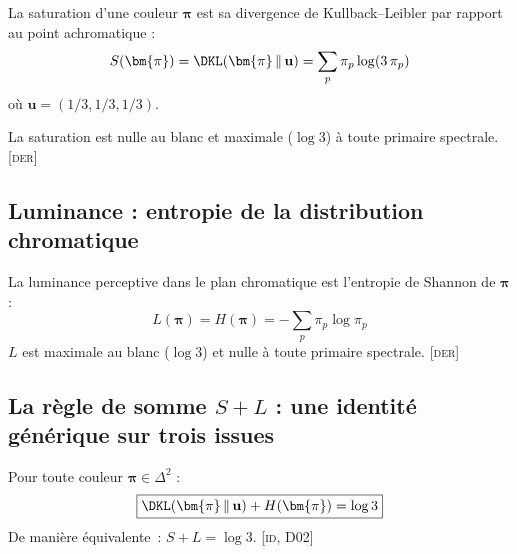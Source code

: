 \documentclass[12pt,a4paper]{article}
\begin{document}
\begin{derivedbox}
La saturation d'une couleur $\bm{\pi}$ est sa divergence de
Kullback--Leibler par rapport au point achromatique :
\begin{equation}
  S(\bm{\pi}) = \DKL(\bm{\pi} \,\|\, \mathbf{u})
    = \sum_{p} \pi_p \log(3\,\pi_p)
  \label{eq:saturation}
\end{equation}
o\`u $\mathbf{u} = (1/3, 1/3, 1/3)$.

La saturation est nulle au blanc et maximale ($\log 3$) \`a toute
primaire spectrale. \textsc{[der]}
\end{derivedbox}

\subsection{Luminance : entropie de la distribution chromatique}

\begin{derivedbox}
La luminance perceptive dans le plan chromatique est l'entropie de
Shannon de $\bm{\pi}$ :
\begin{equation}
  L(\bm{\pi}) = H(\bm{\pi}) = -\sum_{p} \pi_p \log \pi_p
  \label{eq:luminance}
\end{equation}
$L$ est maximale au blanc ($\log 3$) et nulle \`a toute primaire
spectrale. \textsc{[der]}
\end{derivedbox}

\subsection{La r\`egle de somme $S + L$ : une identit\'e g\'en\'erique sur trois issues}

\begin{identitybox}
Pour toute couleur $\bm{\pi} \in \Delta^2$ :
\begin{equation}
  \boxed{\DKL(\bm{\pi} \,\|\, \mathbf{u}) + H(\bm{\pi}) = \log 3}
  \label{eq:gft}
\end{equation}
De mani\`ere \'equivalente~: $S + L = \log 3$.
\textsc{[id, D02]}
\end{identitybox}
\end{document}

